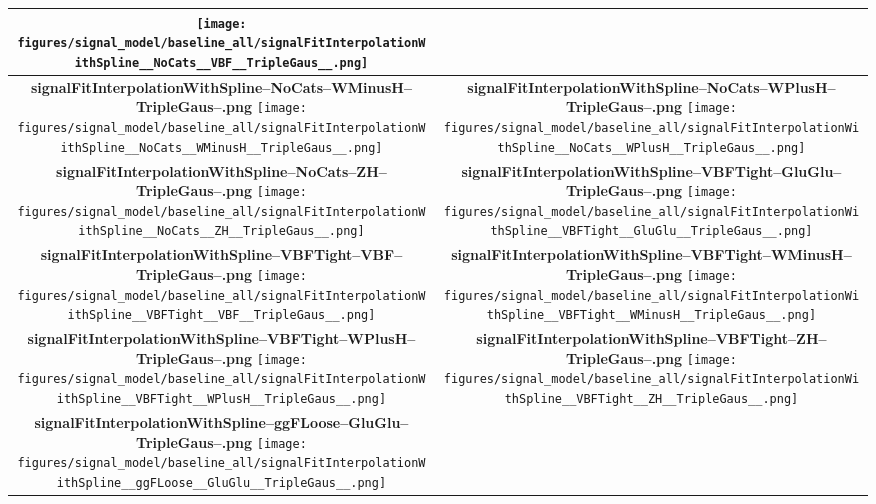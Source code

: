 \begin{longtable}{|c|c|}
{\texttt{[image: figures/signal\_model/baseline\_all/signalFitInterpolationWithSpline\_\_NoCats\_\_VBF\_\_TripleGaus\_\_.png]}
}
 \\
\hline
\parbox{0.49\textwidth}{
\centering
{\bfseries signalFitInterpolationWithSpline--NoCats--WMinusH--TripleGaus--.png}
\texttt{[image: figures/signal\_model/baseline\_all/signalFitInterpolationWithSpline\_\_NoCats\_\_WMinusH\_\_TripleGaus\_\_.png]}
}
 & \parbox{0.49\textwidth}{
\centering
{\bfseries signalFitInterpolationWithSpline--NoCats--WPlusH--TripleGaus--.png}
\texttt{[image: figures/signal\_model/baseline\_all/signalFitInterpolationWithSpline\_\_NoCats\_\_WPlusH\_\_TripleGaus\_\_.png]}
}
 \\
\hline
\parbox{0.49\textwidth}{
\centering
{\bfseries signalFitInterpolationWithSpline--NoCats--ZH--TripleGaus--.png}
\texttt{[image: figures/signal\_model/baseline\_all/signalFitInterpolationWithSpline\_\_NoCats\_\_ZH\_\_TripleGaus\_\_.png]}
}
 & \parbox{0.49\textwidth}{
\centering
{\bfseries signalFitInterpolationWithSpline--VBFTight--GluGlu--TripleGaus--.png}
\texttt{[image: figures/signal\_model/baseline\_all/signalFitInterpolationWithSpline\_\_VBFTight\_\_GluGlu\_\_TripleGaus\_\_.png]}
}
 \\
\hline
\parbox{0.49\textwidth}{
\centering
{\bfseries signalFitInterpolationWithSpline--VBFTight--VBF--TripleGaus--.png}
\texttt{[image: figures/signal\_model/baseline\_all/signalFitInterpolationWithSpline\_\_VBFTight\_\_VBF\_\_TripleGaus\_\_.png]}
}
 & \parbox{0.49\textwidth}{
\centering
{\bfseries signalFitInterpolationWithSpline--VBFTight--WMinusH--TripleGaus--.png}
\texttt{[image: figures/signal\_model/baseline\_all/signalFitInterpolationWithSpline\_\_VBFTight\_\_WMinusH\_\_TripleGaus\_\_.png]}
}
 \\
\hline
\parbox{0.49\textwidth}{
\centering
{\bfseries signalFitInterpolationWithSpline--VBFTight--WPlusH--TripleGaus--.png}
\texttt{[image: figures/signal\_model/baseline\_all/signalFitInterpolationWithSpline\_\_VBFTight\_\_WPlusH\_\_TripleGaus\_\_.png]}
}
 & \parbox{0.49\textwidth}{
\centering
{\bfseries signalFitInterpolationWithSpline--VBFTight--ZH--TripleGaus--.png}
\texttt{[image: figures/signal\_model/baseline\_all/signalFitInterpolationWithSpline\_\_VBFTight\_\_ZH\_\_TripleGaus\_\_.png]}
}
 \\
\hline
\parbox{0.49\textwidth}{
\centering
{\bfseries signalFitInterpolationWithSpline--ggFLoose--GluGlu--TripleGaus--.png}
\texttt{[image: figures/signal\_model/baseline\_all/signalFitInterpolationWithSpline\_\_ggFLoose\_\_GluGlu\_\_TripleGaus\_\_.png]}
}
\end{longtable}

